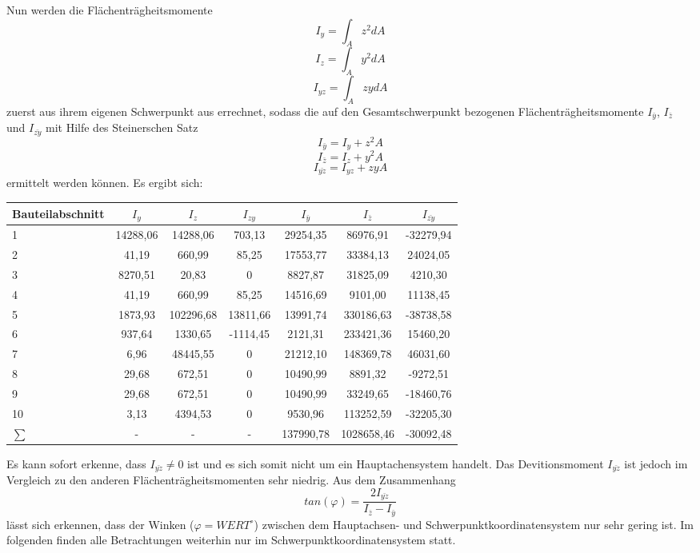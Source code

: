 Nun werden die Flächenträgheitsmomente 
\begin{equation}
	I_{y} = \int_{A}^{}z^2dA
\end{equation}
\begin{equation}
I_{z} = \int_{A}^{}y^2dA
\end{equation}
\begin{equation}
I_{yz} = \int_{A}^{}zydA
\end{equation}
 zuerst aus ihrem eigenen Schwerpunkt aus errechnet, sodass die auf den Gesamtschwerpunkt bezogenen Flächenträgheitsmomente $I_{\bar{y}}$, $I_{\bar{z}}$ und $I_{\bar{zy}}$ mit Hilfe des Steinerschen Satz
 \begin{equation}
 	I_{\bar{y}} = I_{y} + z^2A
 \end{equation}
\begin{equation}
I_{\bar{z}} = I_{z} + y^2A
\end{equation}
\begin{equation}
I_{\bar{yz}} = I_{yz} + zyA
\end{equation}
 ermittelt werden können.
Es ergibt sich:
\begin{center}

\begin{tabular}[h]{l|c|c|c||c|c|c}
Bauteilabschnitt&$I_{y}$&$I_{z}$&$I_{zy}$&$I_{\bar{y}}$&$I_{\bar{z}}$&$I_{\bar{zy}}$\\
\hline
1&14288,06&14288,06&703,13&29254,35&86976,91&-32279,94\\
2&41,19&660,99&85,25&17553,77&33384,13&24024,05\\
3&8270,51&20,83&0&8827,87&31825,09&4210,30\\
4&41,19&660,99&85,25&14516,69&9101,00&11138,45\\
5&1873,93&102296,68&13811,66&13991,74&330186,63&-38738,58\\
6&937,64&1330,65&-1114,45&2121,31&233421,36&15460,20\\
7&6,96&48445,55&0&21212,10&148369,78&46031,60\\
8&29,68&672,51&0&10490,99&8891,32&-9272,51\\
9&29,68&672,51&0&10490,99&33249,65&-18460,76\\
10&3,13&4394,53&0&9530,96&113252,59&-32205,30\\
\hline
$\sum{}$&-&-&-&137990,78&1028658,46&-30092,48
\end{tabular}
\end{center}
Es kann sofort erkenne, dass $I_{\bar{yz}} \neq 0$ ist und es sich somit nicht um ein Hauptachensystem handelt. Das Devitionsmoment  $I_{\bar{yz}}$ ist jedoch im Vergleich zu den anderen Flächenträgheitsmomenten sehr niedrig. 
Aus dem Zusammenhang
\begin{equation}
	tan(\varphi)=\frac{2I_{\bar{yz}}}{I_{\bar{z}}-I_{\bar{y}}}
\end{equation}
lässt sich erkennen, dass der Winken ($\varphi = WERT^\circ$) zwischen dem Hauptachsen- und Schwerpunktkoordinatensystem nur sehr gering ist. Im folgenden finden alle Betrachtungen weiterhin nur im Schwerpunktkoordinatensystem statt.

